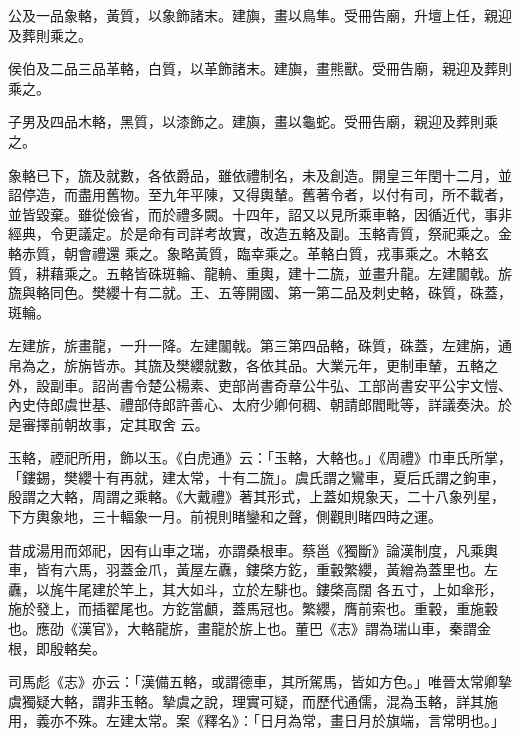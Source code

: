 \begin{pinyinscope}
 公及一品象輅，黃質，以象飾諸末。建旟，畫以鳥隼。受冊告廟，升壇上任，親迎及葬則乘之。



 侯伯及二品三品革輅，白質，以革飾諸末。建旟，畫熊獸。受冊告廟，親迎及葬則乘之。



 子男及四品木輅，黑質，以漆飾之。建旟，畫以龜蛇。受冊告廟，親迎及葬則乘之。



 象輅已下，旒及就數，各依爵品，雖依禮制名，未及創造。開皇三年閏十二月，並詔停造，而盡用舊物。至九年平陳，又得輿輦。舊著令者，以付有司，所不載者，並皆毀棄。雖從儉省，而於禮多闕。十四年，詔又以見所乘車輅，因循近代，事非經典，令更議定。於是命有司詳考故實，改造五輅及副。玉輅青質，祭祀乘之。金輅赤質，朝會禮還
 乘之。象略黃質，臨幸乘之。革輅白質，戎事乘之。木輅玄質，耕藉乘之。五輅皆硃斑輪、龍輈、重輿，建十二旒，並畫升龍。左建闟戟。旂旒與輅同色。樊纓十有二就。王、五等開國、第一第二品及刺史輅，硃質，硃蓋，斑輪。



 左建旂，旂畫龍，一升一降。左建闟戟。第三第四品輅，硃質，硃蓋，左建旃，通帛為之，旂旃皆赤。其旒及樊纓就數，各依其品。大業元年，更制車輦，五輅之外，設副車。詔尚書令楚公楊素、吏部尚書奇章公牛弘、工部尚書安平公宇文愷、內史侍郎虞世基、禮部侍郎許善心、太府少卿何稠、朝請郎閻毗等，詳議奏決。於是審擇前朝故事，定其取舍
 云。



 玉輅，禋祀所用，飾以玉。《白虎通》云：「玉輅，大輅也。」《周禮》巾車氏所掌，「鏤錫，樊纓十有再就，建太常，十有二旒」。虞氏謂之鸞車，夏后氏謂之鉤車，殷謂之大輅，周謂之乘輅。《大戴禮》著其形式，上蓋如規象天，二十八象列星，下方輿象地，三十輻象一月。前視則睹鑾和之聲，側觀則睹四時之運。



 昔成湯用而郊祀，因有山車之瑞，亦謂桑根車。蔡邕《獨斷》論漢制度，凡乘輿車，皆有六馬，羽蓋金爪，黃屋左纛，鏤棨方釳，重轂繁纓，黃繒為蓋里也。左纛，以旄牛尾建於竿上，其大如斗，立於左騑也。鏤棨高闊
 各五寸，上如傘形，施於發上，而插翟尾也。方釳當顱，蓋馬冠也。繁纓，膺前索也。重轂，重施轂也。應劭《漢官》，大輅龍旂，畫龍於旂上也。董巴《志》謂為瑞山車，秦謂金根，即殷輅矣。



 司馬彪《志》亦云：「漢備五輅，或謂德車，其所駕馬，皆如方色。」唯晉太常卿摯虞獨疑大輅，謂非玉輅。摯虞之說，理實可疑，而歷代通儒，混為玉輅，詳其施用，義亦不殊。左建太常。案《釋名》：「日月為常，畫日月於旗端，言常明也。」




\end{pinyinscope}
